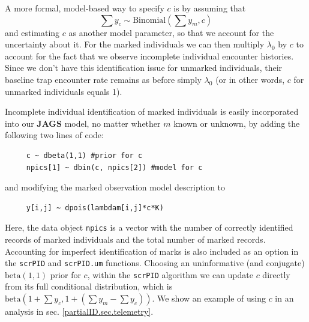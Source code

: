 A more formal, model-based way to specify $c$ is by assuming that
\[
\sum y_c \sim \mbox{Binomial}(\sum y_m, c)
\]
and estimating $c$ as another model parameter, so that we account for the uncertainty about it.
For the marked individuals we can then multiply $\lambda_0$
by $c$ to account for the fact that we observe incomplete individual
encounter histories. Since we don't have this identification issue for
unmarked individuals, their baseline trap encounter rate remains as
before simply $\lambda_0$ (or in other words, $c$ for unmarked individuals equals 1).

Incomplete individual identification of marked individuals is easily
incorporated into our {\bf JAGS} model, no matter whether $m$ known or
unknown, by adding the following two lines of code: 
{\small
\begin{verbatim}
     c ~ dbeta(1,1) #prior for c
     npics[1] ~ dbin(c, npics[2]) #model for c
\end{verbatim}
}
and modifying the marked observation model description to
{\small
\begin{verbatim}
     y[i,j] ~ dpois(lambdam[i,j]*c*K)
\end{verbatim}
}
Here, the data object {\tt npics} is a vector with the number of correctly identified records of marked individuals and the total number of marked records. Accounting for imperfect identification of marks is also included as an option in the {\tt scrPID} and  {\tt scrPID.um} functions. Choosing an uninformative (and conjugate) $\mbox{beta}(1,1)$ prior for $c$, within the {\tt scrPID} algorithm we can update $c$ directly from its full conditional distribution, which is $\mbox{beta}(1 + \sum y_c, 1 + (\sum y_m-\sum y_c))$.
We show an example of using $c$ in an analysis in
sec. \ref{partialID.sec.telemetry}.

